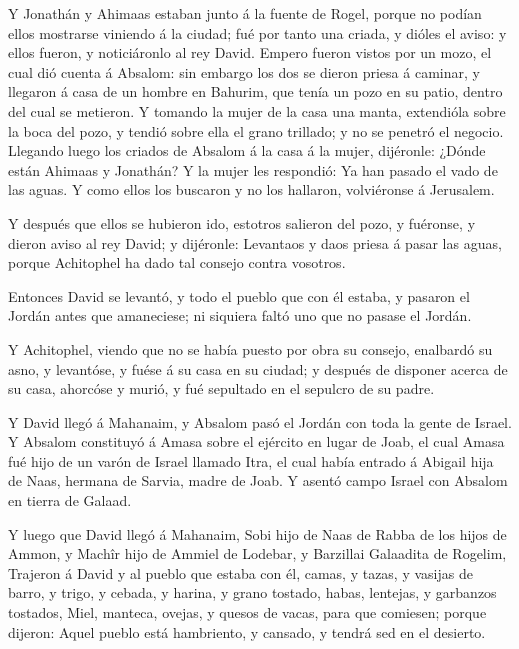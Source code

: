  Y Jonathán y Ahimaas estaban junto á la fuente de Rogel,
porque no podían ellos mostrarse viniendo á la ciudad; fué por tanto una
criada, y dióles el aviso: y ellos fueron, y noticiáronlo al rey David.
 Empero fueron vistos por un mozo, el cual dió cuenta á
Absalom: sin embargo los dos se dieron priesa á caminar, y llegaron á
casa de un hombre en Bahurim, que tenía un pozo en su patio, dentro del
cual se metieron.  Y tomando la mujer de la casa una manta,
extendióla sobre la boca del pozo, y tendió sobre ella el grano
trillado; y no se penetró el negocio.  Llegando luego los
criados de Absalom á la casa á la mujer, dijéronle: ¿Dónde están Ahimaas
y Jonathán? Y la mujer les respondió: Ya han pasado el vado de las
aguas. Y como ellos los buscaron y no los hallaron, volviéronse á
Jerusalem.

 Y después que ellos se hubieron ido, estotros salieron del
pozo, y fuéronse, y dieron aviso al rey David; y dijéronle: Levantaos y
daos priesa á pasar las aguas, porque Achitophel ha dado tal consejo
contra vosotros.

 Entonces David se levantó, y todo el pueblo que con él
estaba, y pasaron el Jordán antes que amaneciese; ni siquiera faltó uno
que no pasase el Jordán.

 Y Achitophel, viendo que no se había puesto por obra su
consejo, enalbardó su asno, y levantóse, y fuése á su casa en su ciudad;
y después de disponer acerca de su casa, ahorcóse y murió, y fué
sepultado en el sepulcro de su padre.

 Y David llegó á Mahanaim, y Absalom pasó el Jordán con
toda la gente de Israel.  Y Absalom constituyó á Amasa
sobre el ejército en lugar de Joab, el cual Amasa fué hijo de un varón
de Israel llamado Itra, el cual había entrado á Abigail hija de Naas,
hermana de Sarvia, madre de Joab.  Y asentó campo Israel
con Absalom en tierra de Galaad.

 Y luego que David llegó á Mahanaim, Sobi hijo de Naas de
Rabba de los hijos de Ammon, y Machîr hijo de Ammiel de Lodebar, y
Barzillai Galaadita de Rogelim,  Trajeron á David y al
pueblo que estaba con él, camas, y tazas, y vasijas de barro, y trigo, y
cebada, y harina, y grano tostado, habas, lentejas, y garbanzos
tostados,  Miel, manteca, ovejas, y quesos de vacas, para
que comiesen; porque dijeron: Aquel pueblo está hambriento, y cansado, y
tendrá sed en el desierto.

